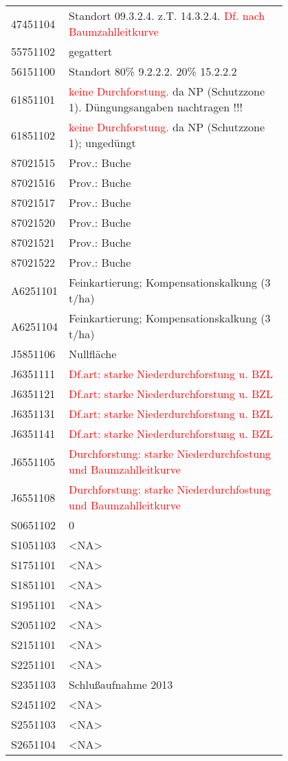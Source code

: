 \begin{singlespace}
{\begin{longtabu}{l p{0.8\linewidth}}
      47451104 & Standort 09.3.2.4. z.T. 14.3.2.4. \textcolor{red}{Df. nach Baumzahlleitkurve} \\
      55751102 & gegattert \\
      56151100 & Standort 80\% 9.2.2.2. 20\% 15.2.2.2 \\
      61851101 & \textcolor{red}{keine Durchforstung.} da NP (Schutzzone 1). Düngungsangaben nachtragen !!! \\
      61851102 & \textcolor{red}{keine Durchforstung.} da NP (Schutzzone 1); ungedüngt \\
      87021515 & Prov.: Buche \\
      87021516 & Prov.: Buche \\
      87021517 & Prov.: Buche \\
      87021520 & Prov.: Buche \\
      87021521 & Prov.: Buche \\
      87021522 & Prov.: Buche \\
      A6251101 & Feinkartierung; Kompensationskalkung (3 t/ha) \\
      A6251104 & Feinkartierung; Kompensationskalkung (3 t/ha) \\
      J5851106 & Nullfläche \\
      J6351111 & \textcolor{red}{Df.art: starke Niederdurchforstung u. BZL} \\
      J6351121 & \textcolor{red}{Df.art: starke Niederdurchforstung u. BZL} \\
      J6351131 & \textcolor{red}{Df.art: starke Niederdurchforstung u. BZL} \\
      J6351141 & \textcolor{red}{Df.art: starke Niederdurchforstung u. BZL} \\
      J6551105 & \textcolor{red}{Durchforstung: starke Niederdurchfostung und Baumzahlleitkurve} \\
      J6551108 & \textcolor{red}{Durchforstung: starke Niederdurchfostung und Baumzahlleitkurve} \\
      S0651102 & 0 \\
      S1051103 & <NA> \\
      S1751101 & <NA> \\
      S1851101 & <NA> \\
      S1951101 & <NA> \\
      S2051102 & <NA> \\
      S2151101 & <NA> \\
      S2251101 & <NA> \\
      S2351103 & Schlußaufnahme 2013 \\
      S2451102 & <NA> \\
      S2551103 & <NA> \\
      S2651104 & <NA> \\
    \end{longtabu}
  }
\end{singlespace}


